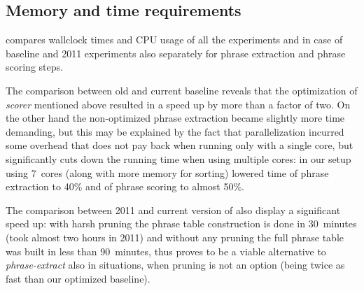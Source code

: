 \subsection{Memory and time requirements}


 compares wallclock times and CPU usage of all the
experiments and in case of baseline and 2011 experiments also separately for phrase
extraction and phrase scoring steps.

The comparison between old and current baseline reveals that the optimization of
\emph{scorer} mentioned above resulted in a speed up by more than a factor of two.
On the other hand the non-optimized phrase extraction became slightly more time demanding,
but this may be explained by the fact that parallelization incurred some overhead
that does not pay back when running only with a single core, but significantly cuts
down the running time when using multiple cores: in our setup using 7~cores (along with
more memory for sorting) lowered time of phrase extraction to 40\% and of phrase scoring
to almost 50\%.

The comparison between 2011 and current version of \eppex{} also display a significant
speed up: with harsh pruning the phrase table construction is done in 30~minutes (took
almost two hours in 2011) and without any pruning the full phrase table was built in
less than 90~minutes, thus \eppex{} proves to be a viable alternative to
\emph{phrase-extract} also in situations, when pruning is not an option (being twice as
fast than our optimized baseline).

